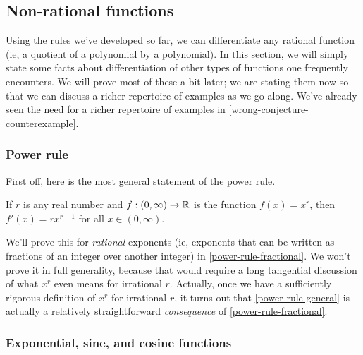 \subsection{Non-rational functions} \label{non-rational}

Using the rules we've developed so far, we can differentiate any rational function (ie, a quotient of a polynomial by a polynomial). In this section, we will simply state some facts about differentiation of other types of functions one frequently encounters. We will prove most of these a bit later; we are stating them now so that we can discuss a richer repertoire of examples as we go along. We've already seen the need for a richer repertoire of examples in \cref{wrong-conjecture-counterexample}. 

\subsubsection*{Power rule}

First off, here is the most general statement of the power rule.

\begin{proposition} \label{power-rule-general} 
	If $r$ is any real number and $f : (0, \infty) \to \mathbb{R}$ is the function $f(x) = x^r$, then $f'(x) = rx^{r-1}$ for all $x \in (0,\infty)$. 
\end{proposition}

We'll prove this for \emph{rational} exponents (ie, exponents that can be written as fractions of an integer over another integer) in \cref{power-rule-fractional}. We won't prove it in full generality, because that would require a long tangential discussion of what $x^r$ even means for irrational $r$. Actually, once we have a sufficiently rigorous definition of $x^r$ for irrational $r$, it turns out that \cref{power-rule-general} is actually a relatively straightforward \emph{consequence} of \cref{power-rule-fractional}. 

\subsubsection*{Exponential, sine, and cosine functions}

